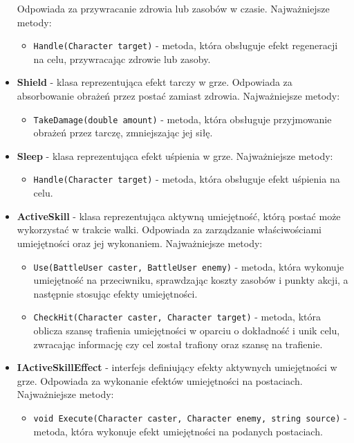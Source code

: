 \begin{itemize}
        Odpowiada za przywracanie zdrowia lub zasobów w czasie. Najważniejsze metody:
            \begin{itemize}
                \item \texttt{Handle(Character target)} - metoda, która obsługuje efekt regeneracji na celu, przywracając zdrowie lub zasoby.
            \end{itemize}
        \item \textbf{Shield} - klasa reprezentująca efekt tarczy w grze. Odpowiada za absorbowanie obrażeń przez postać zamiast zdrowia. Najważniejsze metody:
            \begin{itemize}
                \item \texttt{TakeDamage(double amount)} - metoda, która obsługuje przyjmowanie obrażeń przez tarczę, zmniejszając jej siłę.
            \end{itemize}
        \item \textbf{Sleep} - klasa reprezentująca efekt uśpienia w grze. Najważniejsze metody:
            \begin{itemize}
                \item \texttt{Handle(Character target)} - metoda, która obsługuje efekt uśpienia na celu.
            \end{itemize}
        \item \textbf{ActiveSkill} - klasa reprezentująca aktywną umiejętność, którą postać może wykorzystać w trakcie walki. 
        Odpowiada za zarządzanie właściwościami umiejętności oraz jej wykonaniem. Najważniejsze metody:
            \begin{itemize}
                \item \texttt{Use(BattleUser caster, BattleUser enemy)} - metoda, która wykonuje umiejętność na przeciwniku, sprawdzając koszty zasobów i punkty akcji, a następnie stosując efekty umiejętności.
                \item \texttt{CheckHit(Character caster, Character target)} - metoda, która oblicza szansę trafienia umiejętności w oparciu o dokładność i unik celu, zwracając informację czy cel został trafiony oraz szansę na trafienie.
            \end{itemize}
        \item \textbf{IActiveSkillEffect} - interfejs definiujący efekty aktywnych umiejętności w grze. 
        Odpowiada za wykonanie efektów umiejętności na postaciach. Najważniejsze metody:
            \begin{itemize}
                \item \texttt{void Execute(Character caster, Character enemy, string source)} - metoda, która wykonuje efekt umiejętności na podanych postaciach. 

\end{itemize}
\end{itemize}

